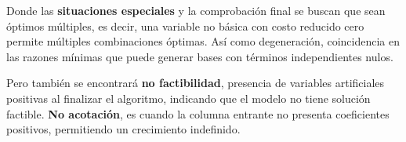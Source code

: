 \documentclass{article}
\begin{document}
Donde las \textbf{situaciones especiales} y la comprobación final se buscan que sean óptimos múltiples, es decir, una variable no básica con costo reducido cero permite múltiples combinaciones óptimas. Así como degeneración, coincidencia en las razones mínimas que puede generar bases con términos independientes nulos.

Pero también se encontrará \textbf{no factibilidad}, presencia de variables artificiales positivas al finalizar el algoritmo, indicando que el modelo no tiene solución factible. \textbf{No acotación}, es cuando la columna entrante no presenta coeficientes positivos, permitiendo un crecimiento indefinido.
\end{document}
